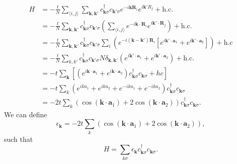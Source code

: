 \documentclass{article}
\numberwithin{equation}{section}
\begin{document}
\begin{align}
    H &= -\frac{t}{N}\sum_{\langle i,j\rangle}\sum_{\bm{k},\bm{k'}} c^{\dagger}_{\bm{k}\sigma}c_{\bm{k}'\sigma}e^{-i\bm{k}\bm{R}_i}e^{i\bm{k'}R_j} + \text{h.c.} \\
    &= -\frac{t}{N} \sum_{\bm{k},\bm{k'}} c^{\dagger}_{\bm{k}\sigma}c_{\bm{k}'\sigma}\left(\sum_{\langle i,j\rangle} e^{-i\bm{k}\cdot \bm{R}_i}e^{i\bm{k}'\cdot \bm{R}_j}\right) + \text{h.c.} \\
    &=-\frac{t}{N} \sum_{\bm{k},\bm{k'}} c^{\dagger}_{\bm{k}\sigma}c_{\bm{k}'\sigma}\sum_i\left(e^{-i(\bm{k}-\bm{k'})\bm{R}_i}\left[e^{i\bm{k'}\cdot\bm{a}_1}+e^{i\bm{k'}\cdot \bm{a}_2}\right]\right) + \text{h.c}\\ 
    &= -\frac{t}{N}\sum_{k,k'}c^{\dagger}_{\bm{k}\sigma}c_{\bm{k}'\sigma} N \delta_{\bm{k},\bm{k}'}\left(e^{i\bm{k'}\cdot \bm{a}_1}+e^{i\bm{k'}\cdot \bm{a}_2}\right) + \text{h.c.} \\
    &= -t\sum_{\bm{k}}\left[\left(e^{i\bm{k}\cdot \bm{a}_1} + e^{i\bm{k}\cdot \bm{a}_2}\right)c^{\dagger}_{\bm{k}\sigma}c_{\bm{k}\sigma}+hc\right] \\ 
    &= -t\sum_k \left(e^{ika_1}+e^{ika_2}+e^{-ika_1}+e^{-ika_2}\right)c^{\dagger}_{\bm{k}\sigma}c_{\bm{k}\sigma} \\
    &= -2t\sum_k \left(\cos(\bm{k}\cdot \bm{a}_1) + 2\cos(\bm{k}\cdot \bm{a}_2)\right)c^{\dagger}_{\bm{k}\sigma}c_{\bm{k}\sigma}.
\end{align}
We can define 
\begin{equation}
    \epsilon_{\bm{k}} = -2t\sum_k \left(\cos(\bm{k}\cdot \bm{a}_1) + 2\cos(\bm{k}\cdot \bm{a}_2)\right),
\end{equation}
such that 
\begin{equation}
    H = \sum_{k\sigma}\epsilon_{\bm{k}}c^{\dagger}_{\bm{k}\sigma}c_{\bm{k}\sigma}.
\end{equation}
\end{document}
